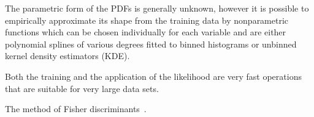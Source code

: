 The parametric form of the PDFs is generally unknown, however it is possible to empirically approximate its shape from the training data by nonparametric functions  which can be chosen individually for each variable and are either polynomial splines of various degrees fitted to binned histograms or unbinned kernel density estimators (KDE).


Both the training and the application of the likelihood are very fast operations that are suitable for very large data sets. %



The method of Fisher discriminants~\cite{Fisher}.

